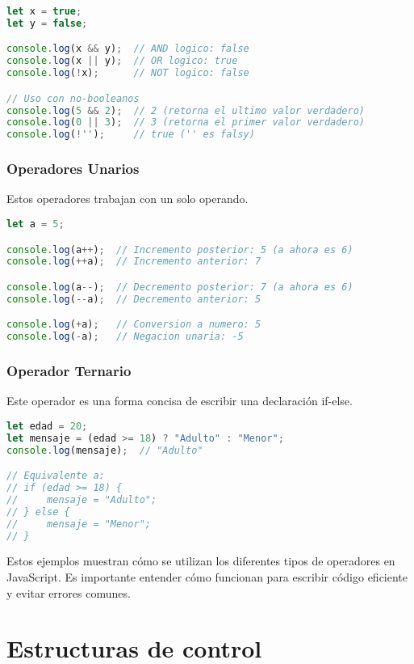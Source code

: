 \documentclass{book}
\begin{document}
\begin{lstlisting}[language=JavaScript]
let x = true;
let y = false;

console.log(x && y);  // AND logico: false
console.log(x || y);  // OR logico: true
console.log(!x);      // NOT logico: false

// Uso con no-booleanos
console.log(5 && 2);  // 2 (retorna el ultimo valor verdadero)
console.log(0 || 3);  // 3 (retorna el primer valor verdadero)
console.log(!'');     // true ('' es falsy)
\end{lstlisting}

\subsubsection{Operadores Unarios}
Estos operadores trabajan con un solo operando.

\begin{lstlisting}[language=JavaScript]
let a = 5;

console.log(a++);  // Incremento posterior: 5 (a ahora es 6)
console.log(++a);  // Incremento anterior: 7

console.log(a--);  // Decremento posterior: 7 (a ahora es 6)
console.log(--a);  // Decremento anterior: 5

console.log(+a);   // Conversion a numero: 5
console.log(-a);   // Negacion unaria: -5
\end{lstlisting}

\subsubsection{Operador Ternario}
Este operador es una forma concisa de escribir una declaración if-else.

\begin{lstlisting}[language=JavaScript]
let edad = 20;
let mensaje = (edad >= 18) ? "Adulto" : "Menor";
console.log(mensaje);  // "Adulto"

// Equivalente a:
// if (edad >= 18) {
//     mensaje = "Adulto";
// } else {
//     mensaje = "Menor";
// }
\end{lstlisting}

Estos ejemplos muestran cómo se utilizan los diferentes tipos de operadores en JavaScript. Es importante entender cómo funcionan para escribir código eficiente y evitar errores comunes.

\section{Estructuras de control}
\end{document}
